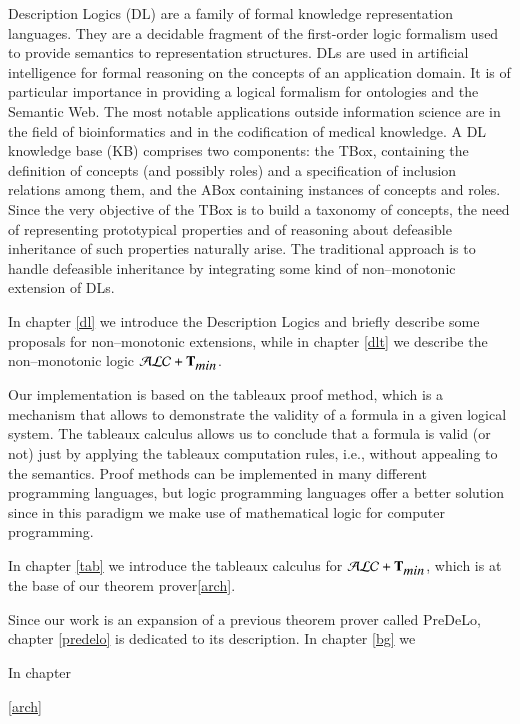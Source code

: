 \documentclass[a4paper, 11pt, oneside]{elsarticle}
\newcommand{\tip}{{\bf T}}
\newcommand{\alctmin}{\mathcal{ALC}+\tip_{\mbox{\em min}}}
\begin{document}
Description Logics (DL) are a family of formal knowledge representation languages. They are a decidable fragment of the first-order logic formalism used to provide semantics to representation structures.
DLs are used in artificial intelligence for formal reasoning on the concepts of an application domain. It is of particular importance in providing a logical formalism for ontologies and the Semantic Web. The most notable applications outside information science are in the field of bioinformatics and in the codification of medical knowledge. A DL knowledge base (KB) comprises two components: the TBox, containing the definition of concepts (and possibly roles) and a specification of inclusion relations among them, and the ABox containing instances of concepts and roles. Since the very objective of the TBox is to build a taxonomy of concepts, the need of representing prototypical properties and of reasoning about defeasible inheritance of such properties naturally arise. The traditional approach is to handle defeasible inheritance by integrating some kind of non--monotonic extension of DLs.

In chapter \ref{dl} we introduce the Description Logics and briefly describe some proposals for non--monotonic extensions, while in chapter \ref{dlt} we describe the non--monotonic logic $\alctmin$.

Our implementation is based on the tableaux proof method, which is a mechanism that allows to demonstrate the validity of a formula in a given logical system.
The tableaux calculus allows us to conclude that a formula is valid (or not) just by applying the tableaux computation rules, i.e., without appealing to the semantics.
Proof methods can be implemented in many different programming languages, but logic programming languages offer a better solution since in this paradigm we make use of mathematical logic for computer programming.

In chapter \ref{tab} we introduce the tableaux calculus for $\alctmin$, which is at the base of our theorem prover\ref{arch}.

Since our work is an expansion of a previous theorem prover called PreDeLo, chapter \ref{predelo} is dedicated to its description. In chapter \ref{bg} we 

In chapter 


\ref{arch}\\
\end{document}
